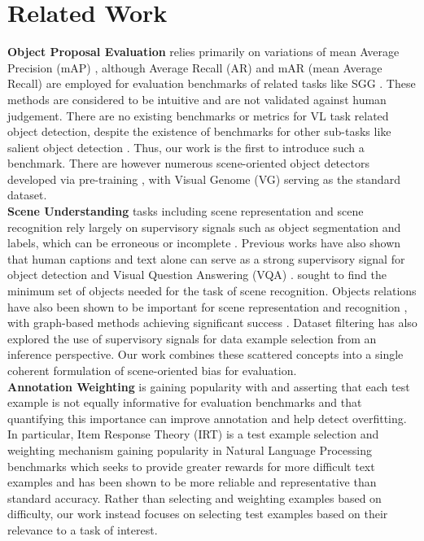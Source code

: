 \documentclass[10pt,twocolumn,letterpaper]{article}
\begin{document}
\section{Related Work}
\noindent
\textbf{Object Proposal Evaluation} relies primarily on variations of mean Average Precision (mAP) \cite{cocoeval2015,evalreview2020,pascal2015,generalizedeval2019}, although Average Recall (AR) and mAR (mean Average Recall) are employed for evaluation benchmarks of related tasks like SGG \cite{sgbase2017}. These methods are considered to be intuitive and are not validated against human judgement. There are no existing benchmarks or metrics for VL task related object detection, despite the existence of benchmarks for other sub-tasks like salient object detection \cite{salient2015}. Thus, our work is the first to introduce such a benchmark. There are however numerous scene-oriented object detectors developed via pre-training \cite{vinvl2021,graphical2019,motifs2018,unbiased2020,sgg2021,topbottom2018}, with Visual Genome (VG) \cite{vg2017} serving as the standard dataset. 
\\
\textbf{Scene Understanding} tasks including scene representation and scene recognition rely largely on supervisory signals such as object segmentation and labels, which can be erroneous or incomplete \cite{because2021}. Previous works have also shown that human captions and text alone can serve as a strong supervisory signal for object detection \cite{vocab2021,weak2021,sam2023} and Visual Question Answering (VQA) \cite{banerjee2021weaqa}. \cite{scene2021} sought to find the minimum set of objects needed for the task of scene recognition. Objects relations have also been shown to be important for scene representation and recognition \cite{relations2020}, with graph-based methods achieving significant success \cite{graphlearning2020}. Dataset filtering \cite{filter2019,filter2020} has also explored the use of supervisory signals for data example selection from an inference perspective. Our work combines these scattered concepts into a single coherent formulation of scene-oriented bias for evaluation.
\\
\textbf{Annotation Weighting} is gaining popularity with \cite{notequal2021} and \cite{right2019} asserting that each test example is not equally informative for evaluation benchmarks and that quantifying this importance can improve annotation and help detect overfitting. In particular, Item Response Theory (IRT) is a test example selection and weighting mechanism gaining popularity in Natural Language Processing benchmarks \cite{irt2016,irt2020,irt2021} which seeks to provide greater rewards for more difficult text examples and has been shown to be more reliable and representative than standard accuracy. Rather than selecting and weighting examples based on difficulty, our work instead focuses on selecting test examples based on their relevance to a task of interest.
\end{document}
